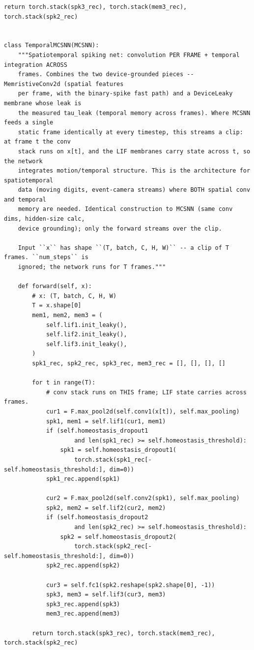 \begin{lstlisting}[caption={mnn\_torch/models.py},label={lst:mnn-src-models}]
        return torch.stack(spk3_rec), torch.stack(mem3_rec), torch.stack(spk2_rec)


class TemporalMCSNN(MCSNN):
    """Spatiotemporal spiking net: convolution PER FRAME + temporal integration ACROSS
    frames. Combines the two device-grounded pieces -- MemristiveConv2d (spatial features
    per frame, with the binary-spike fast path) and a DeviceLeaky membrane whose leak is
    the measured tau_leak (temporal memory across frames). Where MCSNN feeds a single
    static frame identically at every timestep, this streams a clip: at frame t the conv
    stack runs on x[t], and the LIF membranes carry state across t, so the network
    integrates motion/temporal structure. This is the architecture for spatiotemporal
    data (moving digits, event-camera streams) where BOTH spatial conv and temporal
    memory are needed. Identical construction to MCSNN (same conv dims, hidden-size calc,
    device grounding); only the forward streams over the clip.

    Input ``x`` has shape ``(T, batch, C, H, W)`` -- a clip of T frames. ``num_steps`` is
    ignored; the network runs for T frames."""

    def forward(self, x):
        # x: (T, batch, C, H, W)
        T = x.shape[0]
        mem1, mem2, mem3 = (
            self.lif1.init_leaky(),
            self.lif2.init_leaky(),
            self.lif3.init_leaky(),
        )
        spk1_rec, spk2_rec, spk3_rec, mem3_rec = [], [], [], []

        for t in range(T):
            # conv stack runs on THIS frame; LIF state carries across frames.
            cur1 = F.max_pool2d(self.conv1(x[t]), self.max_pooling)
            spk1, mem1 = self.lif1(cur1, mem1)
            if (self.homeostasis_dropout1
                    and len(spk1_rec) >= self.homeostasis_threshold):
                spk1 = self.homeostasis_dropout1(
                    torch.stack(spk1_rec[-self.homeostasis_threshold:], dim=0))
            spk1_rec.append(spk1)

            cur2 = F.max_pool2d(self.conv2(spk1), self.max_pooling)
            spk2, mem2 = self.lif2(cur2, mem2)
            if (self.homeostasis_dropout2
                    and len(spk2_rec) >= self.homeostasis_threshold):
                spk2 = self.homeostasis_dropout2(
                    torch.stack(spk2_rec[-self.homeostasis_threshold:], dim=0))
            spk2_rec.append(spk2)

            cur3 = self.fc1(spk2.reshape(spk2.shape[0], -1))
            spk3, mem3 = self.lif3(cur3, mem3)
            spk3_rec.append(spk3)
            mem3_rec.append(mem3)

        return torch.stack(spk3_rec), torch.stack(mem3_rec), torch.stack(spk2_rec)
\end{lstlisting}

